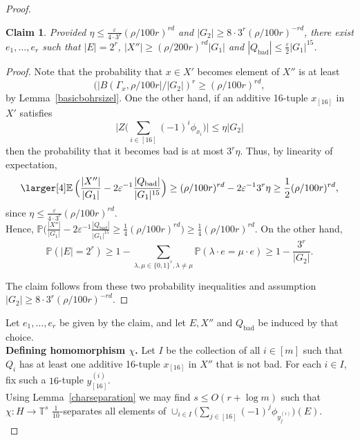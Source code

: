 \documentclass[a4paper,11pt]{article}
\numberwithin{theorem}{section}
\newtheorem{claim}[theorem]{Claim}
\theoremstyle{definition}
\newcommand{\on}[1]{
	\operatorname{#1}
}
\newcommand{\exx}{
  \mathop{
    \mathchoice{\vcenter{\hbox{\larger[4]$\mathbb{E}$}}}
               {\kern0pt\mathbb{E}}
               {\kern0pt\mathbb{E}}
               {\kern0pt\mathbb{E}}
  }\displaylimits
}
\begin{document}
\begin{proof}
    

    \begin{claim} Provided $\eta \leq \frac{\varepsilon}{4\cdot 3^r} (\rho/100r)^{r d}$ and $|G_2| \geq 8 \cdot 3^r (\rho/100r)^{-r d} $, there exist $e_1, \dots, e_r$ such that $|E| = 2^r$, $|X''| \geq (\rho/200r)^{r d} |G_1|$ and $|Q_{\on{bad}}| \leq \frac{\varepsilon}{2} |G_1|^{15}$.
    \end{claim}

    \begin{proof}
        Note that the probability that $x \in X'$ becomes element of $X''$ is at least
        \[(|B(\Gamma_x, \rho/100r| / |G_2|)^{ r} \geq (\rho/100r)^{r d},\]
        by Lemma~\ref{basicbohrsizel}. One the other hand, if an additive 16-tuple $x_{[16]}$ in $X'$ satisfies
        \[\Big|Z\Big(\sum_{i \in [16]} (-1)^i\phi_{x_i}\Big)\Big| \leq \eta |G_2|\]
        then the probability that it becomes bad is at most $3^r \eta$. Thus, by linearity of expectation,
        \[\exx\Big(\frac{|X''|}{|G_1|} - 2\varepsilon^{-1} \frac{|Q_{\on{bad}}|}{|G_1|^{15}}\Big) \geq (\rho/100r)^{ r d} -  2\varepsilon^{-1} 3^r \eta \geq \frac{1}{2}(\rho/100r)^{r d},\]
        since $\eta \leq \frac{\varepsilon}{4 \cdot 3^r} (\rho/100r)^{ r d}$.\\

        Hence, $\mathbb{P}\Big(\frac{|X''|}{|G_1|} - 2\varepsilon^{-1} \frac{|Q_{\on{bad}}|}{|G_1|^{15}} \geq \frac{1}{4}(\rho/100r)^{r d}\Big) \geq \frac{1}{4}(\rho/100r)^{r d}$. On the other hand, 
        \[\mathbb{P}(|E| = 2^r) \geq 1 - \sum_{\lambda, \mu \in \{0,1\}^r, \lambda\not=\mu} \mathbb{P}(\lambda \cdot e = \mu \cdot e) \geq 1 - \frac{3^r}{|G_2|}.\]
        
        The claim follows from these two probability inequalities and assumption $|G_2| \geq 8 \cdot 3^r (\rho/100r)^{-r d}$.
    \end{proof}
    
\vspace{\baselineskip}
    Let $e_1, \dots, e_r$ be given by the claim, and let $E, X''$ and $Q_{\on{bad}}$ be induced by that choice.\\

    \noindent\textbf{Defining homomorphism $\chi$.} Let $I$ be the collection of all $i \in [m]$ such that $Q_i$ has at least one additive 16-tuple $x_{[16]}$ in $X''$ that is not bad. For each $i \in I$, fix such a $16$-tuple $y^{(i)}_{[16]}$.\\
    \indent Using Lemma~\ref{charseparation} we may find $s \leq O(r + \log m)$ such that $\chi : H \to \mathbb{T}^s$ $\frac{1}{10}$-separates all elements of $\cup_{i \in I} \Big(\sum_{j \in [16]} (-1)^j\phi_{y^{(i)}_j}\Big)(E)$.\\


\end{proof}
\end{document}
